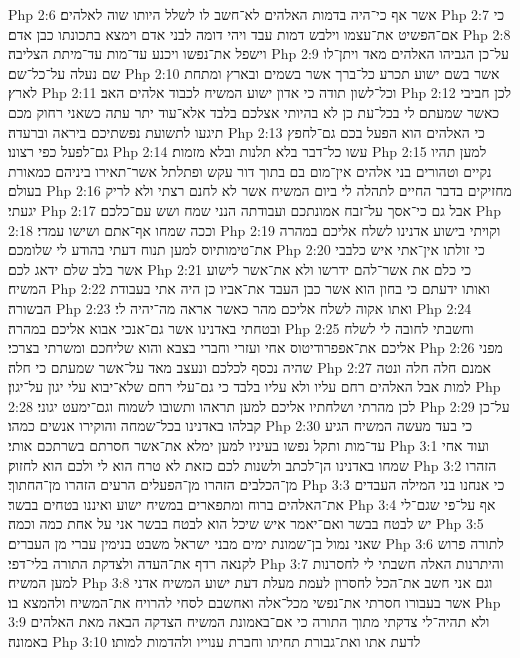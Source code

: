 Php 2:6  אשר אף כי־היה בדמות האלהים לא־חשב לו לשלל היותו שוה לאלהים׃
Php 2:7  כי אם־הפשיט את־עצמו וילבש דמות עבד ויהי דומה לבני אדם וימצא בתכונתו כבן אדם׃
Php 2:8  וישפל את־נפשו ויכנע עד־מות עד־מיתת הצליבה׃
Php 2:9  על־כן הגביהו האלהים מאד ויתן־לו שם נעלה על־כל־שם׃
Php 2:10  אשר בשם ישוע תכרע כל־ברך אשר בשמים ובארץ ומתחת לארץ׃
Php 2:11  וכל־לשון תודה כי אדון ישוע המשיח לכבוד אלהים האב׃
Php 2:12  לכן חביבי כאשר שמעתם לי בכל־עת כן לא בהיותי אצלכם בלבד אלא־עוד יתר עתה כשאני רחוק מכם תיגעו לתשועת נפשתיכם ביראה וברעדה׃
Php 2:13  כי האלהים הוא הפעל בכם גם־לחפץ גם־לפעל כפי רצונו׃
Php 2:14  עשו כל־דבר בלא תלנות ובלא מזמות׃
Php 2:15  למען תהיו נקיים וטהורים בני אלהים אין־מום בם בתוך דור עקש ופתלתל אשר־תאירו ביניהם כמאורת בעולם׃
Php 2:16  מחזיקים בדבר החיים לתהלה לי ביום המשיח אשר לא לחנם רצתי ולא לריק יגעתי׃
Php 2:17  אבל גם כי־אסך על־זבח אמונתכם ועבודתה הנני שמח ושש עם־כלכם׃
Php 2:18  וככה שמחו אף־אתם ושישו עמדי׃
Php 2:19  וקויתי בישוע אדנינו לשלח אליכם במהרה את־טימותיוס למען תנוח דעתי בהודע לי שלומכם׃
Php 2:20  כי זולתו אין־אתי איש כלבבי אשר בלב שלם ידאג לכם׃
Php 2:21  כי כלם את אשר־להם ידרשו ולא את־אשר לישוע המשיח׃
Php 2:22  ואותו ידעתם כי בחון הוא אשר כבן העבד את־אביו כן היה אתי בעבודת הבשורה׃
Php 2:23  ואתו אקוה לשלח אליכם מהר כאשר אראה מה־יהיה לי׃
Php 2:24  ובטחתי באדנינו אשר גם־אנכי אבוא אליכם במהרה׃
Php 2:25  וחשבתי לחובה לי לשלח אליכם את־אפפרודיטוס אחי ועזרי וחברי בצבא והוא שליחכם ומשרתי בצרכי׃
Php 2:26  מפני שהיה נכסף לכלכם ונעצב מאד על־אשר שמעתם כי חלה׃
Php 2:27  אמנם חלה חלה ונטה למות אבל האלהים רחם עליו ולא עליו בלבד כי גם־עלי רחם שלא־יבוא עלי יגון על־יגון׃
Php 2:28  לכן מהרתי ושלחתיו אליכם למען תראהו ותשובו לשמוח וגם־ימעט יגוני׃
Php 2:29  על־כן קבלהו באדנינו בכל־שמחה והוקירו אנשים כמהו׃
Php 2:30  כי בעד מעשה המשיח הגיע עד־מות ותקל נפשו בעיניו למען ימלא את־אשר חסרתם בשרתכם אותי׃
Php 3:1  ועוד אחי שמחו באדנינו הן־לכתב ולשנות לכם כזאת לא טרח הוא לי ולכם הוא לחזוק׃
Php 3:2  הזהרו מן־הכלבים הזהרו מן־הפעלים הרעים הזהרו מן־החתוך׃
Php 3:3  כי אנחנו בני המילה העבדים את־האלהים ברוח ומתפארים במשיח ישוע ואיננו בטחים בבשר׃
Php 3:4  אף על־פי שגם־לי יש לבטח בבשר ואם־יאמר איש שיכל הוא לבטח בבשר אני על אחת כמה וכמה׃
Php 3:5  שאני נמול בן־שמונת ימים מבני ישראל משבט בנימין עברי מן העברים׃
Php 3:6  לתורה פרוש לקנאה רדף את־העדה ולצדקת התורה בלי־דפי׃
Php 3:7  והיתרנות האלה חשבתי לי לחסרנות למען המשיח׃
Php 3:8  וגם אני חשב את־הכל לחסרון לעמת מעלת דעת ישוע המשיח אדני אשר בעבורו חסרתי את־נפשי מכל־אלה ואחשבם לסחי להרויח את־המשיח ולהמצא בו׃
Php 3:9  ולא תהיה־לי צדקתי מתוך התורה כי אם־באמונת המשיח הצדקה הבאה מאת האלהים באמונה׃
Php 3:10  לדעת אתו ואת־גבורת תחיתו וחברת ענוייו ולהדמות למותו׃
